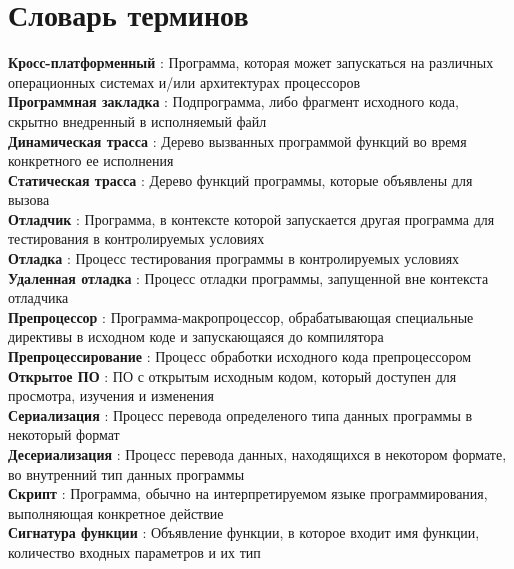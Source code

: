 \chapter*{Словарь терминов}             %

\textbf{Кросс-платформенный} : Программа, которая может запускаться на различных операционных системах и/или архитектурах процессоров \\
\textbf{Программная закладка} : Подпрограмма, либо фрагмент исходного кода, скрытно внедренный в исполняемый файл \\
\textbf{Динамическая трасса} : Дерево вызванных программой функций во время конкретного ее исполнения \\
\textbf{Статическая трасса} : Дерево функций программы, которые объявлены для вызова \\
\textbf{Отладчик} : Программа, в контексте которой запускается другая программа для тестирования в контролируемых условиях \\
\textbf{Отладка} : Процесс тестирования программы в контролируемых условиях \\
\textbf{Удаленная отладка} : Процесс отладки программы, запущенной вне контекста отладчика \\
\textbf{Препроцессор} : Программа-макропроцессор, обрабатывающая специальные директивы в исходном коде и запускающаяся до компилятора  \\
\textbf{Препроцессирование} : Процесс обработки исходного кода препроцессором \\
\textbf{Открытое ПО} : ПО с открытым исходным кодом, который доступен для просмотра, изучения и изменения \\
\textbf{Сериализация} : Процесс перевода определеного типа данных программы в некоторый формат\\
\textbf{Десериализация} : Процесс перевода данных, находящихся в некотором формате, во внутренний тип данных программы\\
\textbf{Скрипт} : Программа, обычно на интерпретируемом языке программирования, выполняющая конкретное действие \\
\textbf{Сигнатура функции} : Объявление функции, в которое входит имя функции, количество входных параметров и их тип \\
